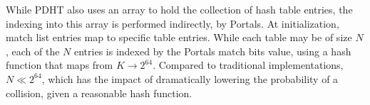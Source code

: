 While PDHT also uses an array to hold the collection of hash table entries, the
indexing into this array is performed indirectly, by Portals. At
initialization, match list entries map to specific table entries. While each
table may be of size $N$, each of the $N$ entries is indexed by the Portals
match bits value, using a hash function that maps from $K \rightarrow 2^{64}$.
Compared to traditional implementations, $N \ll 2^{64}$, which has the impact
of dramatically lowering the probability of a collision, given a reasonable
hash function.








